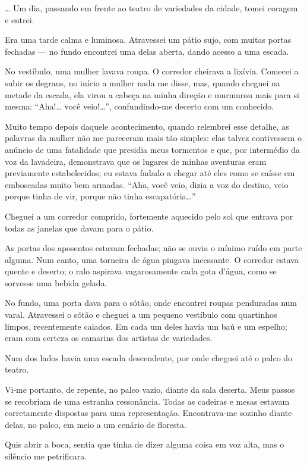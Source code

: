 \ldots{} Um dia, passando em frente ao teatro de variedades da cidade, tomei coragem e entrei.

Era uma tarde calma e luminosa. Atravessei um pátio sujo, com muitas portas fechadas --- no fundo encontrei uma delas aberta, dando acesso a uma escada.

No vestíbulo, uma mulher lavava roupa. O corredor cheirava a lixívia. Comecei a subir os degraus, no início a mulher nada me disse, mas, quando cheguei na metade da escada, ela virou a cabeça na minha direção e murmurou mais para si mesma: ``Aha!\ldots{} você veio!\ldots{}'', confundindo-me decerto com um conhecido.

Muito tempo depois daquele acontecimento, quando relembrei esse detalhe, as palavras da mulher não me pareceram mais tão simples: elas talvez contivessem o anúncio de uma fatalidade que presidia meus tormentos e que, por intermédio da voz da lavadeira, demonstrava que os lugares de minhas aventuras eram previamente estabelecidos; eu estava fadado a chegar até eles como se caísse em emboscadas muito bem armadas. ``Aha, você veio, dizia a voz do destino, veio porque tinha de vir, porque não tinha escapatória\ldots{}''

Cheguei a um corredor comprido, fortemente aquecido pelo sol que entrava por todas as janelas que davam para o pátio.

As portas dos aposentos estavam fechadas; não se ouvia o mínimo ruído em parte alguma. Num canto, uma torneira de água pingava incessante. O corredor estava quente e deserto; o ralo aspirava vagarosamente cada gota d’água, como se sorvesse uma bebida gelada. 

No fundo, uma porta dava para o sótão, onde encontrei roupas penduradas num varal. Atravessei o sótão e cheguei a um pequeno vestíbulo com quartinhos limpos, recentemente caiados. Em cada um deles havia um baú e um espelho; eram com certeza os camarins dos artistas de variedades.

Num dos lados havia uma escada descendente, por onde cheguei até o palco do teatro.

Vi-me portanto, de repente, no palco vazio, diante da sala deserta. Meus passos se recobriam de uma estranha ressonância. Todas as cadeiras e mesas estavam corretamente dispostas para uma representação. Encontrava-me sozinho diante delas, no palco, em meio a um cenário de floresta.

Quis abrir a boca, sentia que tinha de dizer alguma coisa em voz alta, mas o silêncio me petrificara.

